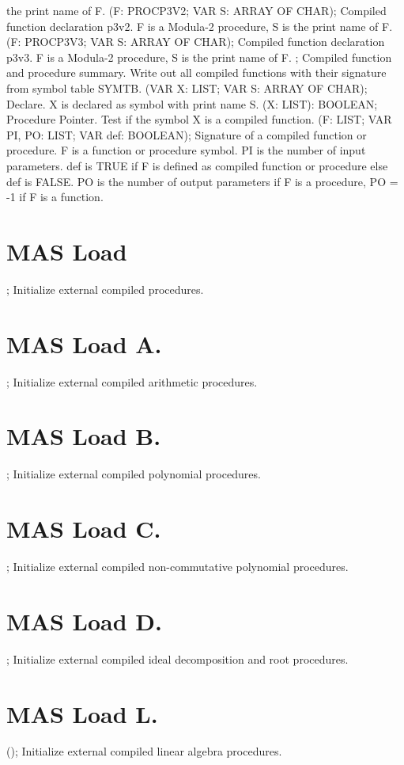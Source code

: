 the print name of F.  \ecom 
{} (F: PROCP3V2; VAR S: ARRAY OF CHAR); \eproc
\bcom Compiled function declaration p3v2. F is a Modula-2 procedure, S is
the print name of F.  \ecom 
{} (F: PROCP3V3; VAR S: ARRAY OF CHAR); \eproc
\bcom Compiled function declaration p3v3. F is a Modula-2 procedure, S is
the print name of F.  \ecom 
{} ; \eproc
\bcom Compiled function and procedure summary. Write out all
compiled functions with their signature from symbol table SYMTB.  \ecom 
{} (VAR X: LIST; VAR S: ARRAY OF CHAR); \eproc
\bcom Declare. X is declared as symbol with print name S.  \ecom 
{} (X: LIST): BOOLEAN; \eproc
\bcom Procedure Pointer. Test if the symbol X is a compiled function.  \ecom 
{} (F: LIST; VAR PI, PO: LIST; VAR def: BOOLEAN); \eproc
\bcom Signature of a compiled function or procedure. F is a function or
procedure symbol. PI is the number of input parameters. def is TRUE if 
F is defined as compiled function or procedure else def is FALSE. 
PO is the number of output parameters if F is a procedure, 
PO = -1 if F is a function.  \ecom 
\section{ MAS Load  } 
 ; \eproc
\bcom Initialize external compiled procedures.  \ecom 
\section{ MAS Load A. } 
 ; \eproc
\bcom Initialize external compiled arithmetic procedures.  \ecom 
\section{ MAS Load B. } 
 ; \eproc
\bcom Initialize external compiled polynomial procedures.  \ecom 
\section{ MAS Load C. } 
 ; \eproc
\bcom Initialize external compiled non-commutative polynomial procedures.  \ecom 
\section{ MAS Load D. } 
 ; \eproc
\bcom Initialize external compiled ideal decomposition and root procedures.  \ecom 
\section{ MAS Load L. } 
 (); \eproc
\bcom Initialize external compiled linear algebra procedures.  \ecom 
